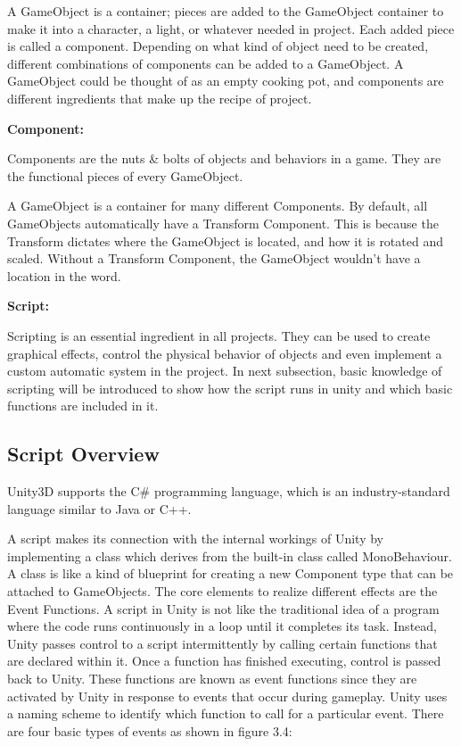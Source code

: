 A GameObject is a container; pieces are added to the GameObject container to make it into a character, a light, or whatever needed in project. Each added piece is called a component. Depending on what kind of object need to be created, different combinations of components can be added to a GameObject. A GameObject could be thought of as an empty cooking pot, and components are different ingredients that make up the recipe of project. 

\textbf{Component:} 

Components are the nuts \& bolts of objects and behaviors in a game. They are the functional pieces of every GameObject.

A GameObject is a container for many different Components. By default, all GameObjects automatically have a Transform Component. This is because the Transform dictates where the GameObject is located, and how it is rotated and scaled. Without a Transform Component, the GameObject wouldn't have a location in the word.

\textbf{Script: }

Scripting is an essential ingredient in all projects. They can be used to create graphical effects, control the physical behavior of objects and even implement a custom automatic system in the project. In next subsection, basic knowledge of scripting will be introduced to show how the script runs in unity and which basic functions are included in it. 


\subsection{Script Overview}
Unity3D supports the C\# programming language, which is an industry-standard language similar to Java or C++.

A script makes its connection with the internal workings of Unity by implementing a class which derives from the built-in class called MonoBehaviour. A class is like a kind of blueprint for creating a new Component type that can be attached to GameObjects. The core elements to realize different effects are the Event Functions. A script in Unity is not like the traditional idea of a program where the code runs continuously in a loop until it completes its task. Instead, Unity passes control to a script intermittently by calling certain functions that are declared within it. Once a function has finished executing, control is passed back to Unity. These functions are known as event functions since they are activated by Unity in response to events that occur during gameplay. Unity uses a naming scheme to identify which function to call for a particular event. There are four basic types of events as shown in figure 3.4:

